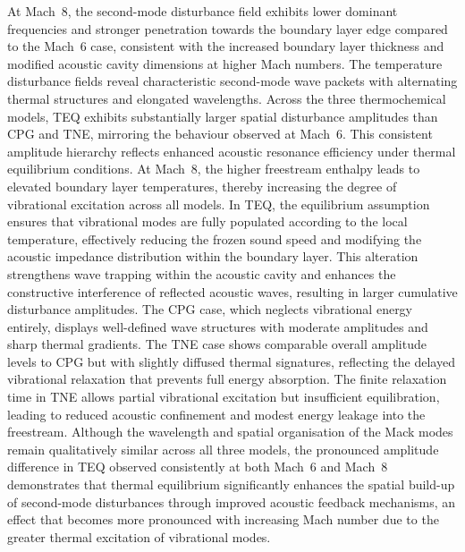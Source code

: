 At Mach~8, the second-mode disturbance field exhibits lower dominant frequencies and stronger penetration towards the boundary layer edge compared to the Mach~6 case, consistent with the increased boundary layer thickness and modified acoustic cavity dimensions at higher Mach numbers. The temperature disturbance fields reveal characteristic second-mode wave packets with alternating thermal structures and elongated wavelengths. Across the three thermochemical models, \gls{TEQ} exhibits substantially larger spatial disturbance amplitudes than \gls{CPG} and \gls{TNE}, mirroring the behaviour observed at Mach~6. This consistent amplitude hierarchy reflects enhanced acoustic resonance efficiency under thermal equilibrium conditions. At Mach~8, the higher freestream enthalpy leads to elevated boundary layer temperatures, thereby increasing the degree of vibrational excitation across all models. In \gls{TEQ}, the equilibrium assumption ensures that vibrational modes are fully populated according to the local temperature, effectively reducing the frozen sound speed and modifying the acoustic impedance distribution within the boundary layer. This alteration strengthens wave trapping within the acoustic cavity and enhances the constructive interference of reflected acoustic waves, resulting in larger cumulative disturbance amplitudes. The \gls{CPG} case, which neglects vibrational energy entirely, displays well-defined wave structures with moderate amplitudes and sharp thermal gradients. The \gls{TNE} case shows comparable overall amplitude levels to \gls{CPG} but with slightly diffused thermal signatures, reflecting the delayed vibrational relaxation that prevents full energy absorption. The finite relaxation time in \gls{TNE} allows partial vibrational excitation but insufficient equilibration, leading to reduced acoustic confinement and modest energy leakage into the freestream. Although the wavelength and spatial organisation of the Mack modes remain qualitatively similar across all three models, the pronounced amplitude difference in \gls{TEQ} observed consistently at both Mach~6 and Mach~8 demonstrates that thermal equilibrium significantly enhances the spatial build-up of second-mode disturbances through improved acoustic feedback mechanisms, an effect that becomes more pronounced with increasing Mach number due to the greater thermal excitation of vibrational modes.


